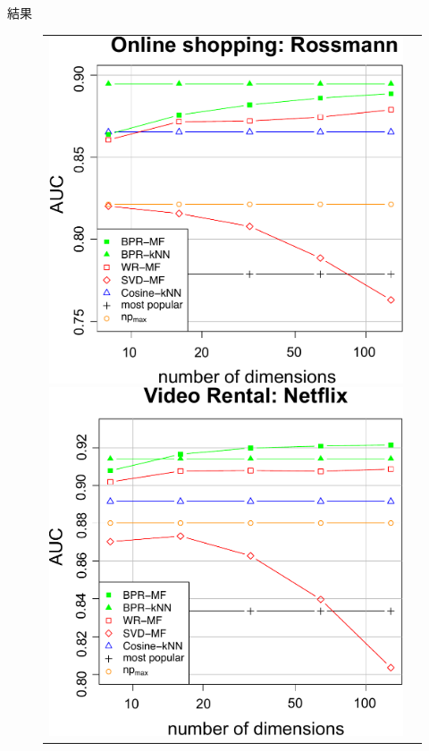\documentclass[aspectratio=43, dvipdfmx, 11pt]{beamer} %
\begin{document}
\begin{frame}{結果}
    \begin{figure}[H]
        \begin{tabular}{cc}
        \begin{minipage}{0.5\hsize}
            \begin{flushleft}
          \includegraphics[scale=0.35]{ross-crop.pdf}
            \end{flushleft}
        \end{minipage}
        \begin{minipage}{0.5\hsize}
            \begin{flushleft}
          \includegraphics[scale=0.35]{net-crop.pdf}

\end{flushleft}
\end{minipage}
\end{tabular}
\end{figure}
\end{frame}
\end{document}
